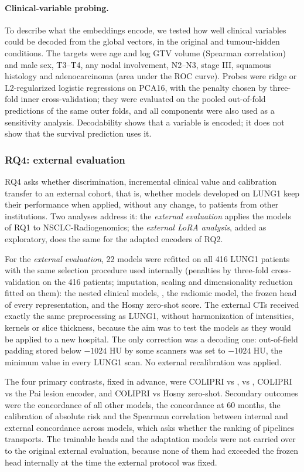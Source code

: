 \paragraph{Clinical-variable probing.} To describe what the embeddings encode, we tested how well clinical variables could be decoded from the global vectors, in the original and tumour-hidden conditions. The targets were age and log GTV volume (Spearman correlation) and male sex, T3--T4, any nodal involvement, N2--N3, stage III, squamous histology and adenocarcinoma (area under the ROC curve). Probes were ridge or L2-regularized logistic regressions on PCA16, with the penalty chosen by three-fold inner cross-validation; they were evaluated on the pooled out-of-fold predictions of the same outer folds, and all components were also used as a sensitivity analysis. Decodability shows that a variable is encoded; it does not show that the survival prediction uses it.

\subsubsection{RQ4: external evaluation}\label{sec:external}
RQ4 asks whether discrimination, incremental clinical value and calibration transfer to an external cohort, that is, whether models developed on LUNG1 keep their performance when applied, without any change, to patients from other institutions. Two analyses address it: the \emph{external evaluation} applies the models of RQ1 to NSCLC-Radiogenomics; the \emph{external LoRA analysis}, added as exploratory, does the same for the adapted encoders of RQ2.

For the \emph{external evaluation}, 22 models were refitted on all 416 LUNG1 patients with the same selection procedure used internally (penalties by three-fold cross-validation on the 416 patients; imputation, scaling and dimensionality reduction fitted on them): the nested clinical models, , the radiomic model, the frozen head of every representation, and the Hosny zero-shot score. The external CTs received exactly the same preprocessing as LUNG1, without harmonization of intensities, kernels or slice thickness, because the aim was to test the models as they would be applied to a new hospital. The only correction was a decoding one: out-of-field padding stored below $-1024$ HU by some scanners was set to $-1024$ HU, the minimum value in every LUNG1 scan. No external recalibration was applied.

The four primary contrasts, fixed in advance, were COLIPRI vs ,  vs , COLIPRI vs the Pai lesion encoder, and COLIPRI vs Hosny zero-shot. Secondary outcomes were the concordance of all other models, the concordance at 60 months, the calibration of absolute risk and the Spearman correlation between internal and external concordance across models, which asks whether the ranking of pipelines transports. The trainable heads and the adaptation models were not carried over to the original external evaluation, because none of them had exceeded the frozen head internally at the time the external protocol was fixed.

